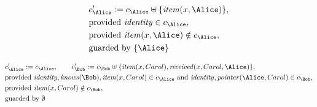 \begin{align*}
&
c'_
{
\Alice
}
 := 
c_
{
\Alice
}
 \uplus 
\{
\mathit{
item
}
(
x
,
\Alice
)
\}
,\\
&
\text{provided } 
\mathit{
identity
}
 \in c_
{
\Alice
}
,\\
&
\text{provided } 
\mathit{
item
}
(
x
,
\Alice
)
 \notin c_
{
\Alice
}
,\\
&
\text{guarded by } \{
\Alice
\}
\end{align*}

\begin{align*}
&
c'_
{
\Alice
}
 := 
c_
{
\Alice
}
, \qquad 
c'_
{
\Bob
}
 := 
c_
{
\Bob
}
 \uplus 
\{
\mathit{
item
}
(
x
,
Carol
)
,
\mathit{
received
}
(
x
,
Carol
,
\Alice
)
\}
,\\
&
\text{provided } 
\mathit{
identity
}
,
\mathit{
knows
}
(
\Bob
)
,
\mathit{
item
}
(
x
,
Carol
)
 \in c_
{
\Alice
}
 \text{ and } 
\mathit{
identity
}
,
\mathit{
pointer
}
(
\Alice
,
Carol
)
 \in c_
{
\Bob
}
,\\
&
\text{provided } 
\mathit{
item
}
(
x
,
Carol
)
 \notin c_
{
\Bob
}
,\\
&
\text{guarded by } \emptyset
\end{align*}
